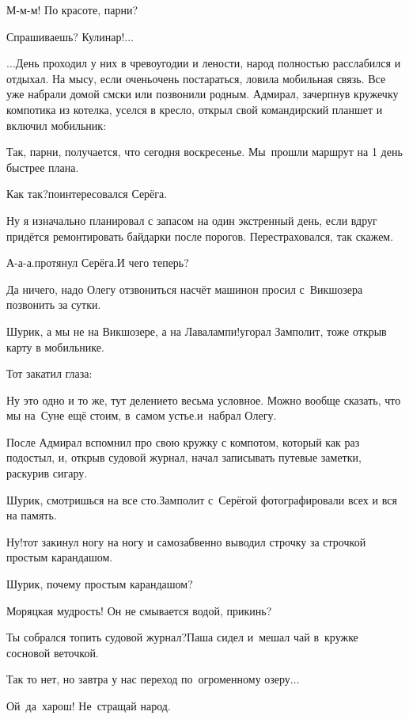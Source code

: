 \diagdash М-м-м! По красоте, парни?

\diagdash Спрашиваешь? Кулинар!$\ldots$

$\ldots$День проходил у них в чревоугодии и лености, народ полностью расслабился и отдыхал. На мысу, если очень\sdash очень  постараться, ловила мобильная связь. Все уже набрали домой смс\sdash ки или позвонили родным. Адмирал, зачерпнув кружечку компотика из котелка, уселся в кресло, открыл свой командирский планшет и включил мобильник:

\diagdash Так, парни, получается, что сегодня воскресенье. Мы~прошли маршрут на 1 день быстрее плана.

\diagdash Как так?\mdash поинтересовался Серёга.

\diagdash Ну я изначально планировал с запасом на один экстренный день, если вдруг придётся ремонтировать байдарки после порогов. Перестраховался, так скажем.

\diagdash А-а-а.\mdash протянул Серёга.\mdash И чего теперь?

\diagdash Да ничего, надо Олегу отзвониться насчёт машин\mdash он просил с~Викшозера позвонить за сутки.

\diagdash Шурик, а мы не на Викшозере, а на Лавалампи!\mdash угорал Замполит, тоже открыв карту в мобильнике.

Тот закатил глаза:

\diagdash Ну это одно и то же, тут деление\sdash то весьма условное. Можно вообще сказать, что мы на~Суне ещё стоим, в~самом устье.\mdash и~набрал Олегу.

После Адмирал вспомнил про свою кружку с компотом, который как раз подостыл, и, открыв судовой журнал, начал записывать путевые заметки, раскурив сигару.

\diagdash Шурик, смотришься на все сто.\mdash Замполит с~Серёгой фотографировали всех и вся на память.

\diagdash Ну!\mdash тот закинул ногу на ногу и самозабвенно выводил строчку за строчкой простым карандашом.

\diagdash Шурик, почему простым карандашом?

\diagdash Моряцкая мудрость! Он не смывается водой, прикинь?

\diagdash Ты собрался топить судовой журнал?\mdash Паша сидел и~мешал чай в~кружке сосновой веточкой.

\diagdash Так то нет, но завтра у нас переход по~огроменному озеру$\ldots$

\diagdash Ой~да~харош! Не~стращай народ.

